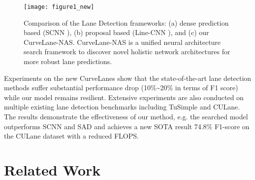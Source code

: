 \documentclass[runningheads]{llncs}
\begin{document}
\begin{figure}[t]


\begin{centering}
\texttt{[image: figure1\_new]}
\par\end{centering}


\caption{\label{fig:benchmark-graph}Comparison of the Lane Detection frameworks:
(a) dense prediction based (SCNN \cite{pan2018spatial}), (b) proposal
based (Line-CNN \cite{li2019line}), and (c) our CurveLane-NAS. CurveLane-NAS
is a unified neural architecture search framework to discover novel
holistic network architectures for more robust lane predictions.}


\end{figure}

Experiments on the new CurveLanes show that the state-of-the-art lane
detection methods suffer substantial performance drop (10\%\textasciitilde 20\%
in terms of F1 score) while our model remains resilient. Extensive
experiments are also conducted on multiple existing lane detection
benchmarks including TuSimple and CULane. The results demonstrate
the effectiveness of our method, e.g. the searched model outperforms SCNN \cite{pan2018spatial} and SAD \cite{hou2019learning}
and achieves a new SOTA result 74.8\% F1-score on the CULane dataset with
a reduced FLOPS.

\section{Related Work}
\end{document}
